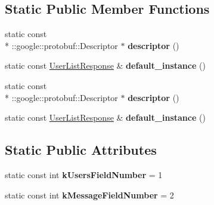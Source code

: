 \subsection*{Static Public Member Functions}
\begin{DoxyCompactItemize}
\item 
\hypertarget{classSimpleChat_1_1UserListResponse_a86588d80967730a330fe8a1f66778122}{static const \\*
\-::google\-::protobuf\-::\-Descriptor $\ast$ {\bfseries descriptor} ()}\label{classSimpleChat_1_1UserListResponse_a86588d80967730a330fe8a1f66778122}

\item 
\hypertarget{classSimpleChat_1_1UserListResponse_ac44368ffc59e770e328d1418cd015201}{static const \hyperlink{classSimpleChat_1_1UserListResponse}{User\-List\-Response} \& {\bfseries default\-\_\-instance} ()}\label{classSimpleChat_1_1UserListResponse_ac44368ffc59e770e328d1418cd015201}

\item 
\hypertarget{classSimpleChat_1_1UserListResponse_a86588d80967730a330fe8a1f66778122}{static const \\*
\-::google\-::protobuf\-::\-Descriptor $\ast$ {\bfseries descriptor} ()}\label{classSimpleChat_1_1UserListResponse_a86588d80967730a330fe8a1f66778122}

\item 
\hypertarget{classSimpleChat_1_1UserListResponse_ac44368ffc59e770e328d1418cd015201}{static const \hyperlink{classSimpleChat_1_1UserListResponse}{User\-List\-Response} \& {\bfseries default\-\_\-instance} ()}\label{classSimpleChat_1_1UserListResponse_ac44368ffc59e770e328d1418cd015201}

\end{DoxyCompactItemize}
\subsection*{Static Public Attributes}
\begin{DoxyCompactItemize}
\item 
\hypertarget{classSimpleChat_1_1UserListResponse_a7dfc88b1d66d710bd51e1beda0e80a35}{static const int {\bfseries k\-Users\-Field\-Number} = 1}\label{classSimpleChat_1_1UserListResponse_a7dfc88b1d66d710bd51e1beda0e80a35}

\item 
\hypertarget{classSimpleChat_1_1UserListResponse_a969be1985ed6791849e0f41e4c7ce413}{static const int {\bfseries k\-Message\-Field\-Number} = 2}\label{classSimpleChat_1_1UserListResponse_a969be1985ed6791849e0f41e4c7ce413}

\end{DoxyCompactItemize}
